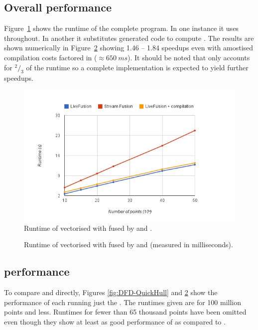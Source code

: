 \documentclass[preamble.tex]{subfiles}
\begin{document}
\subsection{Overall performance}

Figure~\ref{fig:Eval-QuickHull} shows the runtime of the complete \QuickHull program. In one instance it uses \StreamFusion throughout. In another it substitutes \LiveFusion generated code to compute \FilterMax. The results are shown numerically in Figure~\ref{fig:Eval-QuickHull-numbers} showing 1.46 -- 1.84 speedups even with amostised compilation costs factored in ($\approx 650\ ms$). It should be noted that \FilterMax only accounts for $^2/_3$ of the runtime so a complete \LiveFusion implementation is expected to yield further speedups.


\begin{figure}
\includegraphics[center]{img/Eval-QuickHull}
\caption{Runtime of vectorised \QuickHull with \FilterMax fused by \StreamFusion and \LiveFusion.}
\label{fig:Eval-QuickHull}
\end{figure}


\begin{figure}
\caption{Runtime of vectorised \QuickHull with \FilterMax fused by \StreamFusion and \LiveFusion (measured in milliseconds).}
\label{fig:Eval-QuickHull-numbers}
\end{figure}


\subsection{\FilterMax performance}

To compare \LiveFusion and \StreamFusion directly, Figures \ref{fig:DFD-QuickHull} and \ref{fig:Eval-QuickHull-numbers} show the performance of each running just the \FilterMax. The runtimes given are for 100 million points and less. Runtimes for fewer than 65 thousand points have been omitted even though they show at least as good performance of \LiveFusion as compared to \StreamFusion.
\end{document}
